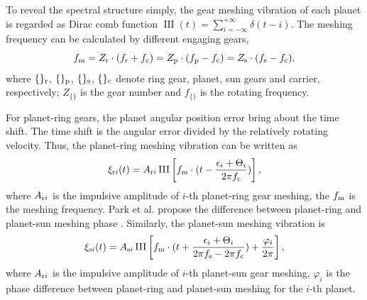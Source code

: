 \documentclass[a4paper,fleqn]{cas-sc}%
\begin{document}
\par To reveal the spectral structure simply, the gear meshing vibration of each planet is regarded as Dirac comb function $\operatorname{III}(t)=\sum_{i=-\infty}^{+\infty}\delta(t-i)$. The meshing frequency can be calculated by different engaging gears,
\begin{equation}
    f_{\rm m}=Z_{\rm r} \cdot (f_{\rm r}+f_{\rm c})=Z_{\rm p} \cdot (f_{\rm p}-f_{\rm c})=Z_{\rm s} \cdot (f_{\rm s}-f_{\rm c}). \label{eq:meshing_frequency}
\end{equation}
where $\{\}_{\rm r}$, $\{\}_{\rm p}$, $\{\}_{\rm s}$, $\{\}_{\rm c}$ denote ring gear, planet, sun gears and carrier, respectively; $Z_{\{\}}$ is the gear number and $f_{\{\}}$ is the rotating frequency. 
\par For planet-ring gears, the planet angular position error bring about the time shift. The time shift is the angular error divided by the relatively rotating velocity. Thus, the planet-ring meshing vibration can be written as
\begin{equation}
    \xi_{{\rm r}i}(t)=A_{{\rm r}i}\operatorname{III}\left[f_{\rm m} \cdot (t-\frac{\epsilon_i+\Theta_i}{2 \pi f_{\rm c}})\right],\label{eq:planet-ring_meshing}
\end{equation}
where $A_{{\rm r}i}$ is the impulsive amplitude of $i$-th planet-ring gear meshing, the $f_{\rm m}$ is the meshing frequency. Park et al. propose the difference between planet-ring and planet-sun meshing phase \cite{Parker2004}. Similarly, the planet-sun meshing vibration is
\begin{equation}
    \xi_{{\rm s}i}(t)=A_{{\rm s}i} \operatorname{III}\left[f_{\rm m} \cdot (t + \frac{\epsilon_i+\Theta_i}{2 \pi f_{\rm s}- 2 \pi f_{\rm c}})+ \frac{\varphi_i}{2 \pi} \right],\label{eq:planet-sun_meshing}
\end{equation}
where $A_{{\rm r}i}$ is the impulsive amplitude of $i$-th planet-sun gear meshing, $\varphi_i$ is the phase difference between planet-ring and planet-sun meshing for the $i$-th planet.
\end{document}
